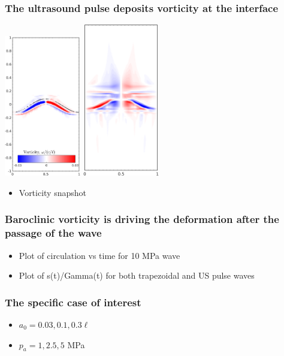 %
\begin{frame}\frametitle{The ultrasound pulse deposits vorticity at the interface}
  \includegraphics[width=0.25\textwidth]{./figs/vorticity_t1_rmawave_1_5000000,0_0,1_45,0_0,0_1,0_1,0_50_100}
  \includegraphics[width=0.25\textwidth]{./figs/vorticity_t20_rmawave_1_5000000,0_0,1_45,0_0,0_1,0_1,0_50_100}
  \begin{itemize}
  \item Vorticity snapshot 
  \end{itemize}
\end{frame}
% 
% 
\begin{frame}\frametitle{Baroclinic vorticity is driving the
    deformation after the passage of the wave}
  \begin{itemize}
  \item Plot of circulation vs time for 10 MPa wave
  \item Plot of s(t)/Gamma(t) for both trapezoidal and US pulse waves
  \end{itemize}
\end{frame}
% 
% 
\begin{frame}\frametitle{The specific case of interest}
  \begin{itemize}
  \item $a_0 = 0.03, 0.1, 0.3\ell$
  \item $p_a = 1, 2.5, 5$ MPa
  \end{itemize}
\end{frame}
